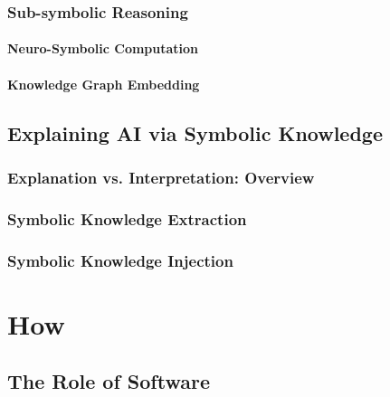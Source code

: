 \documentclass[12pt,a4paper,openright,twoside]{book}
\begin{document}
\cite{logictech-information11}
\cite{lptech4mas-aamas2021}
\cite{lptech4mas-jaamas35}
\cite{Korner2020HistoryFuturePrologTPLP}

\section{Sub-symbolic Reasoning}

\subsection{Neuro-Symbolic Computation}

\subsection{Knowledge Graph Embedding}

\chapter{Explaining AI via Symbolic Knowledge}

\cite{ccnavos-extraamas2021-expectation}

\section{Explanation vs. Interpretation: Overview}

\cite{agentbasedxai-aamas2020}
\cite{agentbasedxai-extraamas2020}

\section{Symbolic Knowledge Extraction}

\cite{aco-extraamas2021-shallow2deep}
\cite{xailp-woa2019}

\section{Symbolic Knowledge Injection}

\cite{nsc4xai-woa2020}

\part{How}
\label{part:how}

\chapter{The Role of Software}
\end{document}
